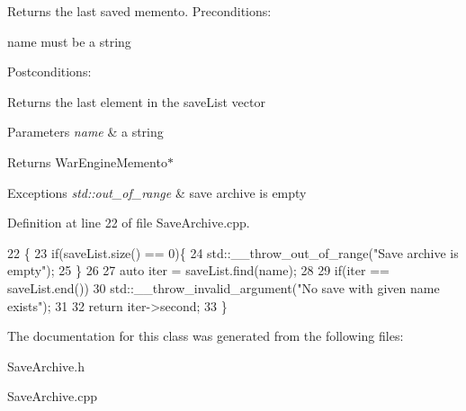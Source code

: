 Returns the last saved memento. Preconditions\+: 


\begin{DoxyItemize}
\item name must be a string
\end{DoxyItemize}

Postconditions\+:
\begin{DoxyItemize}
\item Returns the last element in the save\+List vector
\end{DoxyItemize}


\begin{DoxyParams}{Parameters}
{\em name} & a string\\
\hline
\end{DoxyParams}
\begin{DoxyReturn}{Returns}
War\+Engine\+Memento$\ast$
\end{DoxyReturn}

\begin{DoxyExceptions}{Exceptions}
{\em std\+::out\+\_\+of\+\_\+range} & save archive is empty \\
\hline
\end{DoxyExceptions}


Definition at line 22 of file Save\+Archive.\+cpp.


\begin{DoxyCode}
22                                                      \{
23     \textcolor{keywordflow}{if}(saveList.size() == 0)\{
24         std::\_\_throw\_out\_of\_range(\textcolor{stringliteral}{"Save archive is empty"});
25     \}
26     
27     \textcolor{keyword}{auto} iter = saveList.find(name);
28 
29     \textcolor{keywordflow}{if}(iter == saveList.end())
30         std::\_\_throw\_invalid\_argument(\textcolor{stringliteral}{"No save with given name exists"});
31 
32     \textcolor{keywordflow}{return} iter->second;
33 \}
\end{DoxyCode}


The documentation for this class was generated from the following files\+:\begin{DoxyCompactItemize}
\item 
Save\+Archive.\+h\item 
Save\+Archive.\+cpp\end{DoxyCompactItemize}
